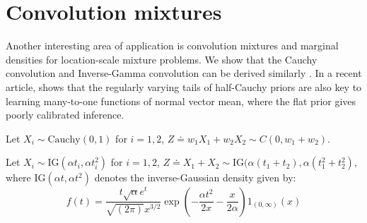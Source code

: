 \documentclass[lineno]{biometrika}
\begin{document}
\section{Convolution mixtures}

Another interesting area of application is convolution mixtures and marginal densities for location-scale mixture problems. We show that the Cauchy convolution \citep{pillai2015unexpected} and Inverse-Gamma convolution can be derived similarly \citep{gelman2006prior, polson2012half, bhadra2015horseshoe+}. In a recent article, \citet{bhadra2015default} shows that the regularly varying tails of half-Cauchy priors are also key to learning many-to-one functions of normal vector mean, where the flat prior gives poorly calibrated inference. 
\begin{lemma}
Let $X_i \sim \mathrm{Cauchy}(0,1)$ for $i =1,2$, $Z \doteq w_1 X_1 + w_2 X_2 \sim C \left( 0, w_1 + w_2 \right)$.
\end{lemma}
\begin{lemma}
Let $X_i \sim \mathrm{IG}(\alpha t_i, \alpha t_i^2)$ for $i = 1,2$, $Z \doteq X_1 + X_2 \sim \mathrm{IG}(\alpha (t_1 + t_2), \alpha (t_1^2+t_2^2)$, where $\mathrm{IG}(\alpha t, \alpha t^2)$ denotes the inverse-Gaussian density given by:
$$
f(t) = \frac{t \sqrt{\alpha} e^t}{\sqrt{(2 \pi)} x^{3/2}} \exp \left( -\frac{\alpha t^2}{2x} - \frac{x}{2\alpha} \right) 1_{(0,\infty)}(x) 
$$
\end{lemma}
\end{document}

